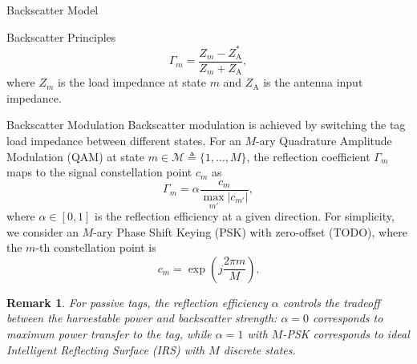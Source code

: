 \documentclass[journal]{IEEEtran}
\newtheorem{remark}{Remark}
\begin{document}
\begin{section}{Backscatter Model}
\begin{subsection}{Backscatter Principles}
			\begin{equation}
				\Gamma_m = \frac{Z_m - Z_{\mathrm{A}}^*}{Z_m + Z_{\mathrm{A}}},
				\label{eq:reflection_coefficient}
			\end{equation}
			where $Z_m$ is the load impedance at state $m$ and $Z_{\mathrm{A}}$ is the antenna input impedance.
		\end{subsection}

		\begin{subsection}{Backscatter Modulation}
			Backscatter modulation is achieved by switching the tag load impedance between different states. For an $M$-ary Quadrature Amplitude Modulation (QAM) at state $m \in \mathcal{M} \triangleq \{1,\ldots,M\}$, the reflection coefficient $\Gamma_m$ maps to the signal constellation point $c_m$ as \cite{Thomas2012a}
			\begin{equation}
				\Gamma_m = \alpha \frac{c_m}{\max_{m'} \lvert c_{m'} \rvert},
				\label{eq:backscatter_modulation}
			\end{equation}
			where $\alpha \in [0,1]$ is the reflection efficiency at a given direction. For simplicity, we consider an $M$-ary Phase Shift Keying (PSK) with zero-offset (TODO), where the $m$-th constellation point is
			\begin{equation}
				c_m = \exp \left(j \frac{2 \pi m}{M}\right).
				\label{eq:mpsk}
			\end{equation}
			\begin{remark}
				For passive tags, the reflection efficiency $\alpha$ controls the tradeoff between the harvestable power and backscatter strength: $\alpha = 0$ corresponds to maximum power transfer to the tag, while $\alpha = 1$ with $M$-PSK corresponds to ideal Intelligent Reflecting Surface (IRS) with $M$ discrete states.
			\end{remark}
		\end{subsection}
	\end{section}
\end{document}
